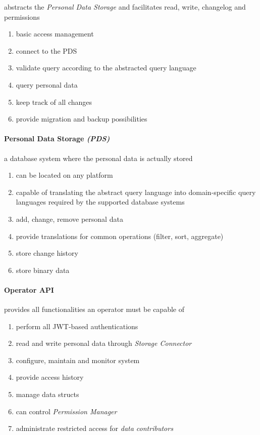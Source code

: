 \documentclass[12pt,english,a4paper,titlepage,cleardoublepage=empty,dottedtoc]{report}
\providecommand{\tightlist}{%
  \setlength{\itemsep}{0pt}\setlength{\parskip}{0pt}}
\begin{document}
abstracts the \emph{Personal Data Storage} and facilitates read, write,
changelog and permissions

\begin{enumerate}
\def\labelenumi{\alph{enumi})}
\tightlist
\item
  basic access management
\item
  connect to the PDS
\item
  validate query according to the abstracted query language
\item
  query personal data
\item
  keep track of all changes
\item
  provide migration and backup possibilities
\end{enumerate}

\paragraph{\texorpdfstring{Personal Data Storage
\emph{(PDS)}}{Personal Data Storage (PDS)}}\label{personal-data-storage-pds}

a database system where the personal data is actually stored

\begin{enumerate}
\def\labelenumi{\alph{enumi})}
\tightlist
\item
  can be located on any platform
\item
  capable of translating the abstract query language into
  domain-specific query languages required by the supported database
  systems
\item
  add, change, remove personal data
\item
  provide translations for common operations (filter, sort, aggregate)
\item
  store change history
\item
  store binary data
\end{enumerate}

\paragraph{Operator API}\label{operator-api-1}

provides all functionalities an operator must be capable of

\begin{enumerate}
\def\labelenumi{\alph{enumi})}
\tightlist
\item
  perform all JWT-based authentications
\item
  read and write personal data through \emph{Storage Connector}
\item
  configure, maintain and monitor system
\item
  provide access history
\item
  manage data structs
\item
  can control \emph{Permission Manager}
\item
  administrate restricted access for \emph{data contributors}
\end{enumerate}
\end{document}
